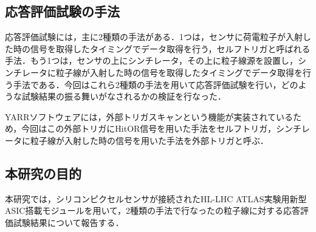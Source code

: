 \subsection{応答評価試験の手法}
応答評価試験には，主に2種類の手法がある．1つは，センサに荷電粒子が入射した時の信号を取得したタイミングでデータ取得を行う，セルフトリガと呼ばれる手法．もう1つは，センサの上にシンチレータ，その上に粒子線源を設置し，シンチレータに粒子線が入射した時の信号を取得したタイミングでデータ取得を行う手法である．今回はこれら2種類の手法を用いて応答評価試験を行い，どのような試験結果の振る舞いがなされるかの検証を行なった．\par
YARRソフトウェアには，外部トリガスキャンという機能が実装されているため，今回はこの外部トリガにHitOR信号を用いた手法をセルフトリガ，シンチレータに粒子線が入射した時の信号を用いた手法を外部トリガと呼ぶ．

\subsection{本研究の目的}
本研究では，シリコンピクセルセンサが接続されたHL-LHC ATLAS実験用新型ASIC搭載モジュールを用いて，2種類の手法で行なったの粒子線に対する応答評価試験結果について報告する．
